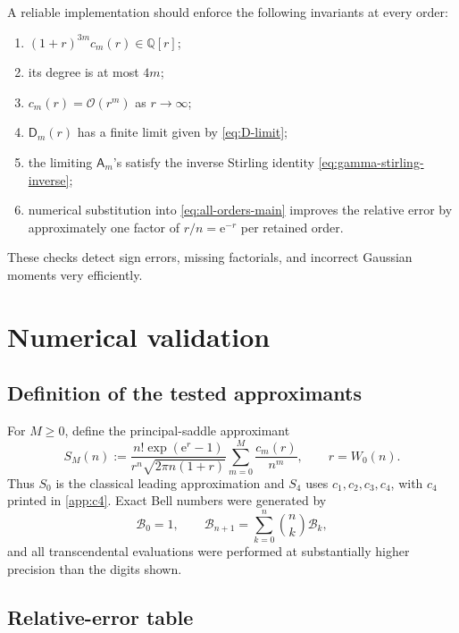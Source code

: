 \documentclass[11pt,a4paper]{article}
\theoremstyle{definition}
\theoremstyle{remark}
\newcommand{\Bell}{\mathcal B}
\newcommand{\Q}{\mathbb Q}
\newcommand{\ee}{\mathrm e}
\newcommand{\BigO}{\mathcal O}
\newcommand{\cA}{\mathsf A}
\newcommand{\cD}{\mathsf D}
\begin{document}
A reliable implementation should enforce the following invariants at every
order:
\begin{enumerate}[label=(\roman*),leftmargin=2.2em,itemsep=2pt]
 \item \((1+r)^{3m}c_m(r)\in\Q[r]\);
 \item its degree is at most \(4m\);
 \item \(c_m(r)=\BigO(r^m)\) as \(r\to\infty\);
 \item \(\cD_m(r)\) has a finite limit given by \cref{eq:D-limit};
 \item the limiting \(\cA_m\)'s satisfy the inverse Stirling identity
       \cref{eq:gamma-stirling-inverse};
 \item numerical substitution into \cref{eq:all-orders-main} improves the
       relative error by approximately one factor of \(r/n=\ee^{-r}\) per
       retained order.
\end{enumerate}
These checks detect sign errors, missing factorials, and incorrect Gaussian
moments very efficiently.

\section{Numerical validation}\label{sec:numerics}

\subsection{Definition of the tested approximants}

For \(M\ge0\), define the principal-saddle approximant
\begin{equation}\label{eq:SM-def}
 S_M(n):=
 \frac{n!\exp(\ee^r-1)}{r^n\sqrt{2\pi n(1+r)}}
 \sum_{m=0}^{M}\frac{c_m(r)}{n^m},
 \qquad r=W_0(n).
\end{equation}
Thus \(S_0\) is the classical leading approximation and \(S_4\) uses
\(c_1,c_2,c_3,c_4\), with \(c_4\) printed in
\cref{app:c4}.  Exact Bell numbers were generated by
\begin{equation}\label{eq:bell-recurrence-numerics}
 \Bell_0=1,
 \qquad
 \Bell_{n+1}=\sum_{k=0}^{n}\binom{n}{k}\Bell_k,
\end{equation}
and all transcendental evaluations were performed at substantially higher
precision than the digits shown.

\subsection{Relative-error table}
\end{document}
